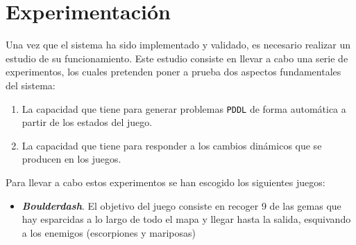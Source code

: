 
\chapter{Experimentación}

Una vez que el sistema ha sido implementado y validado, es necesario realizar un estudio
de su funcionamiento. Este estudio consiste en llevar a cabo una serie de experimentos,
los cuales pretenden poner a prueba dos aspectos fundamentales del sistema:

\begin{enumerate}
    \item La capacidad que tiene para generar problemas \texttt{PDDL} de forma
    automática a partir de los estados del juego.
    \item La capacidad que tiene para responder a los cambios dinámicos que
    se producen en los juegos.
\end{enumerate}

Para llevar a cabo estos experimentos se han escogido los siguientes juegos:

\begin{itemize}[label=\textbullet]
    \item \textbf{\textit{Boulderdash}}. El objetivo del juego consiste en recoger 9 de
    las gemas que hay esparcidas a lo largo de todo el mapa y llegar hasta la salida,
    esquivando a los enemigos (escorpiones y mariposas)
\end{itemize}

